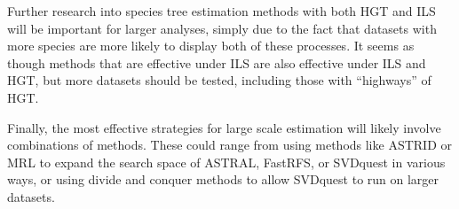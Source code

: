 Further research into species tree estimation methods with both HGT and ILS will be important for larger analyses, simply due to the fact that datasets with more species are more likely to display both of these processes. It seems as though methods that are effective under ILS are also effective under ILS and HGT, but more datasets should be tested, including those with ``highways'' of HGT.

Finally, the most effective strategies for large scale estimation will likely involve combinations of methods. These could range from using methods like ASTRID or MRL to expand the search space of ASTRAL, FastRFS, or SVDquest in various ways, or using divide and conquer methods to allow SVDquest to run on larger datasets. 